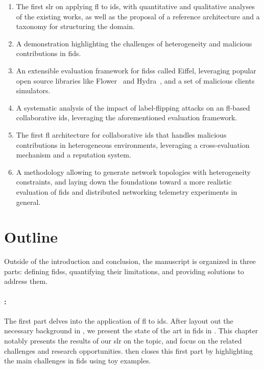 \begin{enumerate}
  \item The first \gls{slr} on applying \gls{fl} to \gls{ids}, with quantitative and qualitative analyses of the existing works, as well as the proposal of a reference architecture and a taxonomy for structuring the domain.
  \item A demonstration highlighting the challenges of heterogeneity and malicious contributions in \gls{fids}.
  \item An extensible evaluation framework for \glspl{fids} called Eiffel, leveraging popular open source libraries like Flower~\cite{beutel_Flowerfriendlyfederated_2020} and Hydra~\cite{Hydra}, and a set of malicious clients simulators. 
  \item A systematic analysis of the impact of label-flipping attacks on an \gls{fl}-based collaborative \gls{ids}, leveraging the aforementioned evaluation framework.
  \item The first \gls{fl} architecture for collaborative \gls{ids} that handles malicious contributions in heterogeneous environments, leveraging a cross-evaluation mechanism and a reputation system.
  \item A methodology allowing to generate network topologies with heterogeneity constraints, and laying down the foundations toward a more realistic evaluation of \gls{fids} and distributed networking telemetry experiments in general.
\end{enumerate}


\section{Outline\label{sec:intro.outline}}

Outside of the introduction and conclusion, the manuscript is organized in three parts: defining \glspl{fids}, quantifying their limitations, and providing solutions to address them.

\paragraph{:}

The first part delves into the application of \gls{fl} to \gls{ids}.
After layout out the necessary background in , we present the state of the art in \gls{fids} in .
This chapter notably presents the results of our \gls{slr} on the topic, and focus on the related challenges and research opportunities.
 then closes this first part by highlighting the main challenges in \gls{fids} using toy examples.


